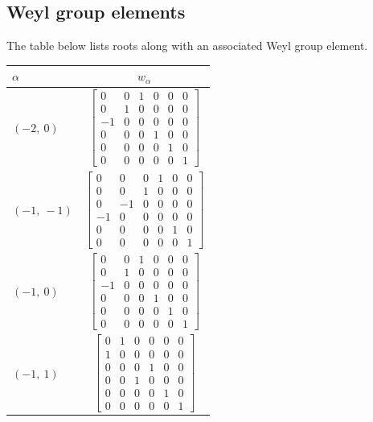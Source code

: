 \documentclass[11pt]{article}
\newcommand{\noi}{\noindent}
\theoremstyle{definition}
\begin{document}
\subsection{Weyl group elements}

\noi The table below lists roots along with an associated Weyl group element.

\bigskip

\noi \noindent \begin{longtable}{|l|c|}
    \hline
    $\alpha$ & $w_\alpha$ \\
    \hline
    \endhead
    $\left( -2, \  0\right)$ & ${\left[\begin{matrix}0 & 0 & 1 & 0 & 0 & 0\\0 & 1 & 0 & 0 & 0 & 0\\-1 & 0 & 0 & 0 & 0 & 0\\0 & 0 & 0 & 1 & 0 & 0\\0 & 0 & 0 & 0 & 1 & 0\\0 & 0 & 0 & 0 & 0 & 1\end{matrix}\right]}$ \\
    \hline
    $\left( -1, \  -1\right)$ & ${\left[\begin{matrix}0 & 0 & 0 & 1 & 0 & 0\\0 & 0 & 1 & 0 & 0 & 0\\0 & -1 & 0 & 0 & 0 & 0\\-1 & 0 & 0 & 0 & 0 & 0\\0 & 0 & 0 & 0 & 1 & 0\\0 & 0 & 0 & 0 & 0 & 1\end{matrix}\right]}$ \\
    \hline
    $\left( -1, \  0\right)$ & ${\left[\begin{matrix}0 & 0 & 1 & 0 & 0 & 0\\0 & 1 & 0 & 0 & 0 & 0\\-1 & 0 & 0 & 0 & 0 & 0\\0 & 0 & 0 & 1 & 0 & 0\\0 & 0 & 0 & 0 & 1 & 0\\0 & 0 & 0 & 0 & 0 & 1\end{matrix}\right]}$ \\
    \hline
    $\left( -1, \  1\right)$ & ${\left[\begin{matrix}0 & 1 & 0 & 0 & 0 & 0\\1 & 0 & 0 & 0 & 0 & 0\\0 & 0 & 0 & 1 & 0 & 0\\0 & 0 & 1 & 0 & 0 & 0\\0 & 0 & 0 & 0 & 1 & 0\\0 & 0 & 0 & 0 & 0 & 1\end{matrix}\right]}$ \\

\end{longtable}
\end{document}

